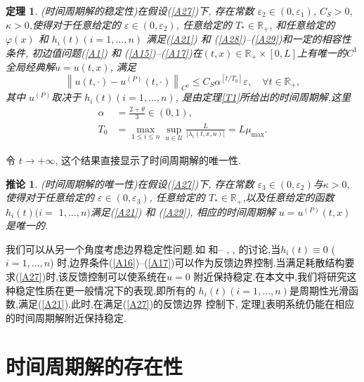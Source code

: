 \documentclass[notitlepage,cs4size,punct,oneside]{ctexrep}
\numberwithin{equation}{chapter}
\theoremstyle{mystyle}
\newtheorem{theorem}[definition]{\hspace{2em}定理}
\newtheorem{corollary}[definition]{\hspace{2em}推论}
\begin{document}
\begin{theorem}\label{T2} (时间周期解的稳定性)在假设(\ref{A27})下, 存在常数 $\varepsilon_{2} \in\left(0, \varepsilon_{1}\right)$, $C_{S}>0$, $\kappa>0 $,使得对于任意给定的 $\varepsilon \in\left(0, \varepsilon_{2}\right)$, 任意给定的 $T_{*} \in \mathbb{R}_{+}$, 和任意给定的 $\varphi(x)$ 和 $h_{i}(t)(i=1, \ldots, n)$ 满足(\ref{A21}) 和 (\ref{A28})--(\ref{A29})和一定的相容性条件, 初边值问题(\ref{A1}) 和 (\ref{A15})--(\ref{A17})在$(t, x) \in \mathbb{R}_{+} \times[0, L]$上有唯一的$C^{1}$全局经典解$u=u(t, x)$, 满足
    \begin{equation}\label{A32}
        \left\|u(t, \cdot)-u^{(P)}(t, \cdot)\right\|_{C^{0}} \leq C_{S} \alpha^{\left[t / T_{0}\right]} \varepsilon, \quad \forall t \in \mathbb{R}_{+},
    \end{equation}
    其中 $u^{(P)}$取决于 $h_{i}(t)(i=1, \ldots, n)$, 是由定理\ref{T1}所给出的时间周期解,这里
    \begin{align}
        \alpha & = \frac{2 + \theta}{3} \in (0, 1), \label{A33}                                                                           \\
        T_{0}  & = \max_{1 \leq i \leq n} \sup_{u \in \mathcal{U}} \frac{L}{\left|\lambda_{i}(t, x, u)\right|} = L \mu_{\max}.\label{A34}
    \end{align}
\end{theorem}
令 $t \rightarrow+\infty$, 这个结果直接显示了时间周期解的唯一性.

\begin{corollary}\label{P3}(时间周期解的唯一性)在假设(\ref{A27})下, 存在常数 $\varepsilon_{3} \in\left(0, \varepsilon_{2}\right)$与$\kappa >0 $, 使得对于任意给定的 $\varepsilon \in \left( 0, \varepsilon_{3} \right) $, 任意给定的 $T_{*} \in \mathbb{R}_{+}$,以及任意给定的函数 $h_{i}(t)(i=$ $1, \ldots, n)$满足(\ref{A21}) 和 (\ref{A29}), 相应的时间周期解 $u=u^{(P)}(t, x)$ 是唯一的.
\end{corollary}
我们可以从另一个角度考虑边界稳定性问题.如\cite{14, 18, 23} 和\cite{1}-- \cite{11}, \cite{13}, \cite{16}的讨论,当$h_i(t) \equiv 0$ ($i = 1, ..., n $)  时,边界条件(\ref{A16})--(\ref{A17})可以作为反馈边界控制.当满足耗散结构要求(\ref{A27})时,该反馈控制可以使系统在$ u = 0$ 附近保持稳定.在本文中,我们将研究这种稳定性质在更一般情况下的表现,即所有的 $h_i(t)(i = 1, ..., n)$是周期性光滑函数,满足(\ref{A21}).此时,在满足(\ref{A27})的反馈边界 控制下, 定理\ref{T2}表明系统仍能在相应的时间周期解附近保持稳定.

\chapter{时间周期解的存在性}
\end{document}
